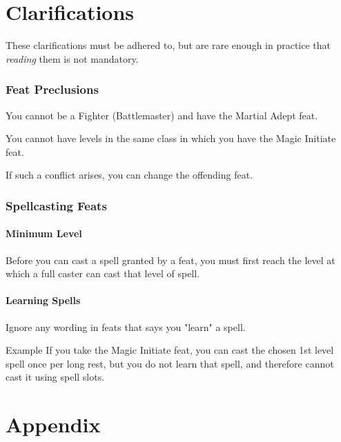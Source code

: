 \documentclass[letterpaper,twocolumn,openany,nodeprecatedcode]{dndbook}
\begin{document}
\chapter{Clarifications}

These clarifications must be adhered to, but are rare enough in practice that \textit{reading} them is not mandatory.

\subsection{Feat Preclusions}
You cannot be a Fighter (Battlemaster) and have the Martial Adept feat.

You cannot have levels in the same class in which you have the Magic Initiate feat.

If such a conflict arises, you can change the offending feat.

\subsection{Spellcasting Feats}

\subsubsection{Minimum Level}
Before you can cast a spell granted by a feat, you must first reach the level at which a full caster can cast that level of spell.

\subsubsection{Learning Spells}
Ignore any wording in feats that says you "learn" a spell.

\begin{DndComment}{Example}
If you take the Magic Initiate feat, you can cast the chosen 1st level spell once per long rest, but you do not learn that spell, and therefore cannot cast it using spell slots.
\end{DndComment}











\chapter{Appendix}
\end{document}
